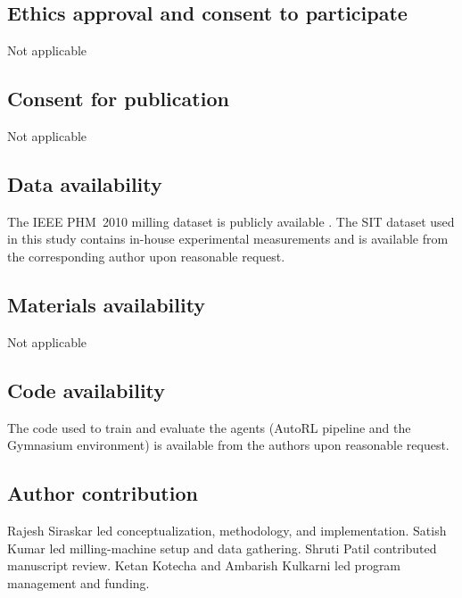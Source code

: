 \documentclass[sn-basic]{sn-jnl} %
\begin{document}
\subsection*{Ethics approval and consent to participate}
Not applicable

\subsection*{Consent for publication}
Not applicable

\subsection*{Data availability}
The IEEE PHM~2010 milling dataset is publicly available \cite{PHMdata2010}. The SIT dataset used in this study contains in-house experimental measurements and is available from the corresponding author upon reasonable request.

\subsection*{Materials availability}
Not applicable

\subsection*{Code availability}
The code used to train and evaluate the agents (AutoRL pipeline and the Gymnasium environment) is available from the authors upon reasonable request.

\subsection*{Author contribution}
Rajesh Siraskar led conceptualization, methodology, and implementation. Satish Kumar led milling-machine setup and data gathering. Shruti Patil contributed manuscript review. Ketan Kotecha and Ambarish Kulkarni led program management and funding.
\end{document}
